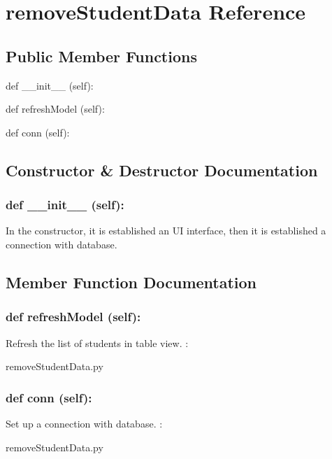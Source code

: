 \hypertarget{removeStudentData}{\section{removeStudentData Reference}
\label{removeStudentData}
}
\subsection*{Public Member Functions}
\begin{DoxyCompactItemize}
\item 
def {\_\_init\_\_} (self):
\item 
def {refreshModel} (self):
\item 
def {conn} (self):

\end{DoxyCompactItemize}

\subsection{Constructor \& Destructor Documentation}
\hypertarget{class_poly_aa3def076b74bed67904976ad4f9fe9b1}{
\subsubsection[{def __init__ (self):}]{\setlength{\rightskip}{0pt plus 5cm}def {\_\_init\_\_} (self): 
}}
In the constructor, it is established an UI interface, then it is  established a connection with database.

\subsection{Member Function Documentation}
\hypertarget{class_poly_a14a7ad77ce612b0c54f531d307ee4b39}{
\subsubsection[{def refreshModel (self):}]{\setlength{\rightskip}{0pt plus 5cm}def {refreshModel} (self):}}\label{class_poly_a14a7ad77ce612b0c54f531d307ee4b39}
Refresh the list of students in table view. 
:\begin{DoxyCompactItemize}
\item 
removeStudentData.\-py\end{DoxyCompactItemize}

\hypertarget{class_poly_a14a7ad77ce612b0c54f531d307ee4b39}{
\subsubsection[{def conn (self):}]{\setlength{\rightskip}{0pt plus 5cm}def {conn} (self):}}\label{class_poly_a14a7ad77ce612b0c54f531d307ee4b39}
Set up a connection with database.
:\begin{DoxyCompactItemize}
\item 
removeStudentData.\-py\end{DoxyCompactItemize}


